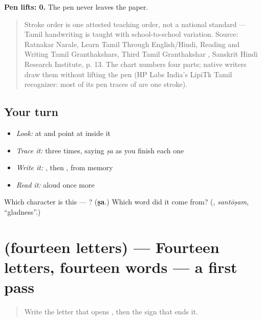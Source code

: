 \textbf{Pen lifts: 0.} The pen never leaves the paper.

\begin{quote}
Stroke order is one attested teaching order, not a national standard — Tamil handwriting is taught with school-to-school variation. Source: Ratnakar Narale, Learn Tamil Through English/Hindi, Reading and Writing Tamil Granthakshars, Third Tamil Granthakshar , Sanskrit Hindi Research Institute, p. 13. The chart numbers four parts; native writers draw them without lifting the pen (HP Labs India's LipiTk Tamil recognizer: most of its pen traces of  are one stroke).
\end{quote}

\subsection*{Your turn}
\begin{itemize}
\raggedright
  \item \emph{Look:} at \textbf{} and point at  inside it
  \item \emph{Trace it:}  three times, saying \emph{ṣa} as you finish each one
  \item \emph{Write it:} , then , from memory
  \item \emph{Read it:} \textbf{} aloud once more
\end{itemize}

\begin{tcolorbox}[breakable,colback=teal!4,colframe=teal!35!black,title={Before you move on}]
Which character is this — ? (\textbf{ṣa}.) Which word did it come from? (\textbf{}, \emph{santōṣam}, \textquotedblleft{}gladness\textquotedblright{}.)
\end{tcolorbox}
\section[(fourteen letters)]{(fourteen letters) — Fourteen letters, fourteen words — a first pass}

\label{lesson:TA-R112-letters-first-pass}



\begin{quote}
Write the letter that opens , then the sign that ends it.
\end{quote}

